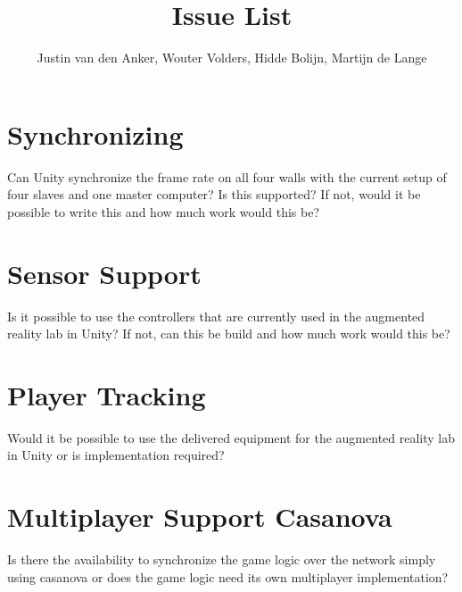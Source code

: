 \documentclass[10pt,a4paper]{article}
\author{Justin van den Anker, Wouter Volders, Hidde Bolijn, Martijn de Lange}
\title{Issue List}
\begin{document}
\maketitle
\section{Synchronizing}
Can Unity synchronize the frame rate on all four walls with the current setup of four slaves and one master computer? Is this supported? If not, would it be possible to write this and how much work would this be?

\section{Sensor Support}
Is it possible to use the controllers that are currently used in the augmented reality lab in Unity? If not, can this be build and how much work would this be?

\section{Player Tracking}
Would it be possible to use the delivered equipment for the augmented reality lab in Unity or is implementation required?


\section{Multiplayer Support Casanova}
Is there the availability to synchronize the game logic over the network simply using casanova or does the game logic need its own multiplayer implementation?
\end{document}
